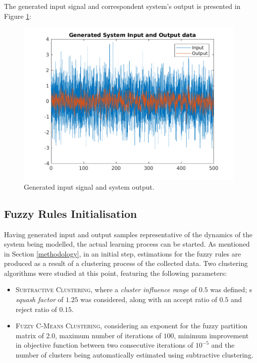\documentclass[11pt]{article}
\begin{document}
The generated input signal and correspondent system's output is presented in Figure \ref{generated_input_output}:

\begin{figure}[ht]
	\centering
	\includegraphics[scale=0.5]{images/randomInputOutput.png}
	\caption{Generated input signal and system output.}
	\label{generated_input_output}
\end{figure}


\subsection{Fuzzy Rules Initialisation}

Having generated input and output samples representative of the dynamics of the system being modelled, the actual learning process can be started. As mentioned in Section \ref{methodology}, in an initial step, estimations for the fuzzy rules are produced as a result of a clustering process of the collected data. Two clustering algorithms were studied at this point, featuring the following parameters:

\begin{itemize}
	\item \textsc{Subtractive Clustering}, where a \emph{cluster influence range} of $0.5$ was defined; s \emph{squash factor} of $1.25$ was considered, along with an accept ratio of $0.5$ and reject ratio of $0.15$.
	
	\item \textsc{Fuzzy C-Means Clustering}, considering an exponent for the fuzzy partition matrix of $2.0$, maximum number of iterations of $100$, minimum improvement in objective function between two consecutive iterations of $10^{-5}$ and the number of clusters being automatically estimated using subtractive clustering.
\end{itemize}
\end{document}
